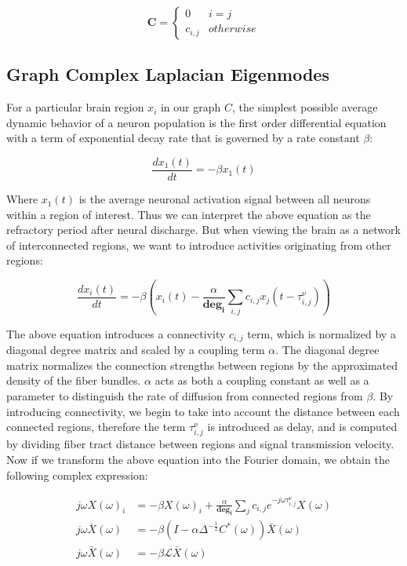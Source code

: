 \documentclass{article}
\begin{document}
\[ \mathbf{C} = \begin{cases}
    0 & i = j\\
    c_{i,j} & otherwise
    \end{cases}
    \]

\subsection{Graph Complex Laplacian Eigenmodes}
For a particular brain region $x_i$ in our graph $C$, the simplest possible average dynamic behavior of a neuron population is the first order differential equation with a term of exponential decay rate that is governed by a rate constant $\beta$:

\begin{equation}
    \label{dampedSys}
      \frac{dx_{1}(t)}{dt} = -\beta x_{1}(t)
\end{equation}

Where $x_{1}(t)$ is the average neuronal activation signal between all neurons within a region of interest. Thus we can interpret the above equation as the refractory period after neural discharge. But when viewing the brain as a network of interconnected regions, we want to introduce activities originating from other regions:

\begin{equation}
  \frac{dx_{i}(t)}{dt} = -\beta (x_{i}(t) - \frac{\alpha}{\pmb{deg_i}} \sum_{i,j} c_{i,j} x_{j}(t-\tau^{\nu}_{i,j}))
\end{equation}

The above equation introduces a connectivity $c_{i,j}$ term, which is normalized by a diagonal degree matrix and scaled by a coupling term $\alpha$. The diagonal degree matrix normalizes the connection strengths between regions by the approximated density of the fiber bundles. $\alpha$ acts as both a coupling constant as well as a parameter to distinguish the rate of diffusion from connected regions from $\beta$. By introducing connectivity, we begin to take into account the distance between each connected regions, therefore the term $\tau^{\nu}_{i,j}$ is introduced as delay, and is computed by dividing fiber tract distance between regions and signal transmission velocity. Now if we transform the above equation into the Fourier domain, we obtain the following complex expression:

\begin{equation}
    \begin{aligned}
        j\omega X(\omega)_{i} &= -\beta X(\omega)_{i} + \frac{\alpha}{\pmb{deg_i}} \sum_j c_{i,j} e^{-j\omega \tau^{\nu}_{i,j}} X(\omega)\\
        j\omega \bar{X}(\omega) &= -\beta (I - \alpha \Delta^{-\frac{1}{2}} C^{*}(\omega)) \bar{X}(\omega)\\
        j\omega \bar{X}(\omega) &= -\beta \mathcal{L}\bar{X}(\omega)\\
    \end{aligned}
\end{equation}
\end{document}
